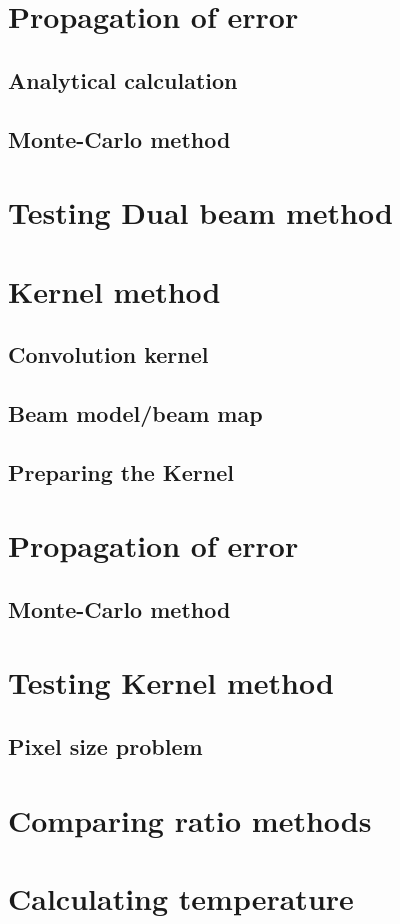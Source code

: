 \begin{figure(}
\section{Propagation of error}
\subsection{Analytical calculation}
\subsection{Monte-Carlo method}
\section{Testing Dual beam method}
\section{Kernel method}
\subsection{Convolution kernel}
\subsection{Beam model/beam map}
\subsection{Preparing the Kernel}
\section{Propagation of error}
\subsection{Monte-Carlo method}
\section{Testing Kernel method}
\subsection{Pixel size problem}
\section{Comparing ratio methods}
\section{Calculating temperature}

\end{figure(}
